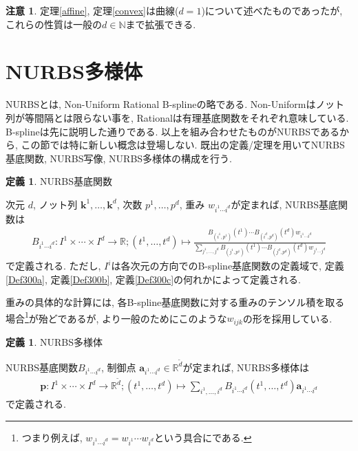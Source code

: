 \documentclass{jsarticle}
\newcommand\setN{\mathbb{N}}
\newcommand\setR{\mathbb{R}}
\theoremstyle{definition}%
\newtheorem{defn}[thm]{定義}
\newtheorem*{rem}{注意}
\newcommand\UC{\textcolor{red}{(執筆中です)}}
\begin{document}
\begin{rem}
    定理\ref{affine}, 定理\ref{convex}は曲線($d=1$)について述べたものであったが, これらの性質は一般の$d\in \setN$まで拡張できる.
\end{rem}





%
%
%
%
%


\newpage
\section{NURBS多様体}
NURBSとは, Non-Uniform Rational B-splineの略である.
Non-Uniformはノット列が等間隔とは限らない事を, Rationalは有理基底関数をそれぞれ意味している.
B-splineは先に説明した通りである.
以上を組み合わせたものがNURBSであるから, この節では特に新しい概念は登場しない.
既出の定義/定理を用いてNURBS基底関数, NURBS写像, NURBS多様体の構成を行う.

\begin{screen}
	\begin{defn}
        NURBS基底関数

        次元 $d$, ノット列 $\bm{k}^1,\dots,\bm{k}^d$, 次数 $p^1,\dots,p^d$, 重み $w_{i^1\cdots i^d}$が定まれば, NURBS基底関数は
		\begin{align}
            B_{i^1\cdots i^d}:I^1\times\cdots\times I^d\to\setR;
            (t^1,\dots,t^d)\mapsto\frac{B_{(i^1,p^1)}(t^1)\cdots B_{(i^d,p^d)}(t^d)w_{i^1\cdots i^d}}{\sum\limits_{j^1,\dots,j^d}B_{(j^1,p^1)}(t^1)\cdots B_{(j^d,p^d)}(t^d)w_{j^1\cdots j^d}}
		\end{align}
		で定義される.
        ただし, $I^i$は各次元の方向でのB-spline基底関数の定義域で, 定義\ref{Def300a}, 定義\ref{Def300b}, 定義\ref{Def300c}の何れかによって定義される.
	\end{defn}
\end{screen}
重みの具体的な計算には, 各B-spline基底関数に対する重みのテンソル積を取る場合\footnote{つまり例えば, $w_{i^1\cdots i^d}=w_{i^1}\cdots w_{i^d}$という具合にである.}が殆どであるが, より一般のためにこのような$w_{ijk}$の形を採用している.
\begin{screen}
	\begin{defn}
        NURBS多様体

        NURBS基底関数$B_{i^1\cdots i^d}$, 制御点 $\bm{a}_{i^1\cdots i^d}\in\setR^{\tilde{d}}$が定まれば, NURBS多様体は
		\begin{align}
            \bm{p}:I^1\times\cdots\times I^d\to\setR^{\tilde{d}};
            (t^1,\dots,t^d)\mapsto\sum_{i^1,\dots,i^d} B_{i^1\cdots i^d}(t^1,\dots,t^d)\bm{a}_{i^1\cdots i^d}
		\end{align}
		で定義される.
	\end{defn}
\end{screen}
\end{document}
